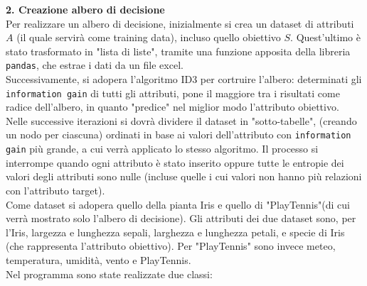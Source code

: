 \documentclass[]{article}
\begin{document}
\newpage
{\Large \textbf{2. Creazione albero di decisione}}\\
Per realizzare un albero di decisione, inizialmente si crea un dataset di attributi $A$ (il quale servirà come training data), incluso quello obiettivo $S$. 
Quest'ultimo è stato trasformato in "lista di liste", tramite una funzione apposita della libreria \texttt{pandas}, che estrae i dati da un file excel.\\
Successivamente, si adopera l'algoritmo ID3 per cortruire l'albero: determinati gli \texttt{information gain} di tutti gli attributi, pone 
il maggiore tra i risultati come radice dell'albero, in quanto "predice" nel miglior modo l'attributo obiettivo. 
Nelle successive iterazioni si dovrà dividere il dataset in "sotto-tabelle", (creando un nodo per ciascuna) ordinati in base ai valori dell'attributo con \texttt{information gain} più grande, 
a cui verrà applicato lo stesso algoritmo.  
Il processo si interrompe quando ogni attributo è stato inserito oppure tutte le entropie dei valori degli attributi sono nulle 
(incluse quelle i cui valori non hanno più relazioni con l'attributo target).\\
Come dataset si adopera quello della pianta Iris e quello di "PlayTennis"(di cui verrà mostrato solo l'albero di decisione). 
Gli attributi dei due dataset sono, per l'Iris, largezza e lunghezza sepali, larghezza e lunghezza petali, e specie di Iris (che rappresenta l'attributo obiettivo). 
Per "PlayTennis" sono invece meteo, temperatura, umidità, vento e PlayTennis.\\
Nel programma sono state realizzate due classi:
\end{document}
